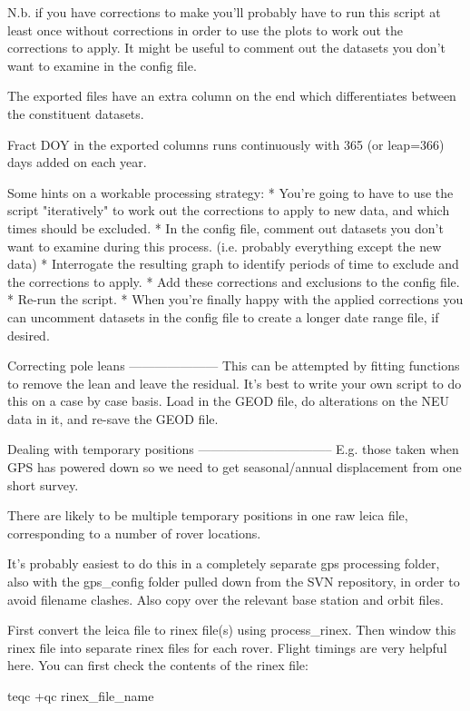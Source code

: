\documentclass[11pt]{article} %
\begin{document}
N.b. if you have corrections to make you'll probably have to run this script at least once without corrections in order to use the plots to work out the corrections to apply. It might be useful to comment out the datasets you don't want to examine in the config file.

The exported files have an extra column on the end which differentiates between the constituent datasets.

Fract DOY in the exported columns runs continuously with 365 (or leap=366) days added on each year.

Some hints on a workable processing strategy:
* You're going to have to use the script "iteratively" to work out the corrections to apply to new data, and which times should be excluded.
* In the config file, comment out datasets you don't want to examine during this process. (i.e. probably everything except the new data)  
* Interrogate the resulting graph to identify periods of time to exclude and the corrections to apply.
* Add these corrections and exclusions to the config file.
* Re-run the script.
* When you're finally happy with the applied corrections you can uncomment datasets in the config file to create a longer date range file, if desired.  


Correcting pole leans
---------------------
This can be attempted by fitting functions to remove the lean and leave the residual.
It's best to write your own script to do this on a case by case basis.
Load in the GEOD file, do alterations on the NEU data in it, and re-save the GEOD file.


Dealing with temporary positions
--------------------------------
E.g. those taken when GPS has powered down so we need to get seasonal/annual displacement from one short survey.

There are likely to be multiple temporary positions in one raw leica file, corresponding to a number of rover locations.

It's probably easiest to do this in a completely separate gps processing folder, also with the gps_config folder pulled down from the SVN repository, in order to avoid filename clashes. Also copy over the relevant base station and orbit files.

First convert the leica file to rinex file(s) using process_rinex. Then window this rinex file into separate rinex files for each rover. Flight timings are very helpful here. You can first check the contents of the rinex file:

  teqc +qc rinex_file_name
  
\end{document}
